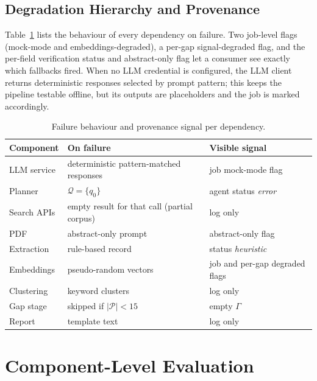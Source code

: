 \documentclass[conference]{IEEEtran}
\newcommand{\cP}{\mathcal{P}}
\newcommand{\cQ}{\mathcal{Q}}
\begin{document}
\subsection{Degradation Hierarchy and Provenance}
Table~\ref{tab:degrade} lists the behaviour of every dependency on failure. Two job-level flags (mock-mode and embeddings-degraded), a per-gap signal-degraded flag, and the per-field verification status and abstract-only flag let a consumer see exactly which fallbacks fired. When no LLM credential is configured, the LLM client returns deterministic responses selected by prompt pattern; this keeps the pipeline testable offline, but its outputs are placeholders and the job is marked accordingly.

\begin{table}[!t]
\caption{Failure behaviour and provenance signal per dependency.}
\label{tab:degrade}
\centering
\small
\begin{tabular}{@{}>{\raggedright\arraybackslash}p{1.7cm}>{\raggedright\arraybackslash}p{2.55cm}>{\raggedright\arraybackslash}p{2.95cm}@{}}
\toprule
Component & On failure & Visible signal \\
\midrule
LLM service & deterministic pattern-matched responses & job mock-mode flag \\
Planner & $\cQ=\{q_0\}$ & agent status \textit{error} \\
Search APIs & empty result for that call (partial corpus) & log only \\
PDF & abstract-only prompt & abstract-only flag \\
Extraction & rule-based record & status \textit{heuristic} \\
Embeddings & pseudo-random vectors & job and per-gap degraded flags \\
Clustering & keyword clusters & log only \\
Gap stage & skipped if $|\cP|<15$ & empty $\Gamma$ \\
Report & template text & log only \\
\bottomrule
\end{tabular}
\end{table}

\section{Component-Level Evaluation}
\label{sec:eval}
\end{document}
